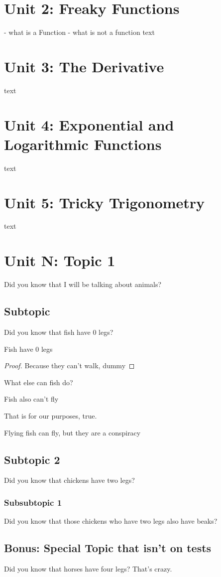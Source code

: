 \documentclass[11pt]{scrartcl}
\begin{document}
\newpage{}
\section{Unit 2: Freaky Functions}
- what is a Function
- what is not a function
text

\newpage{}
\section{Unit 3: The Derivative}

text

\newpage{}
\section{Unit 4: Exponential and Logarithmic Functions}

text

\newpage{}
\section{Unit 5: Tricky Trigonometry}

text

\newpage{}
\section{Unit N: Topic 1}
Did you know that I will be talking about animals?
\subsection{Subtopic}
Did you know that fish have 0 legs?
\begin{theorem}
    Fish have 0 legs
\end{theorem}
\begin{proof}
    Because they can't walk, dummy 
\end{proof}
What else can fish do?
\begin{lemma}
    Fish also can't fly
\end{lemma}
That is for our purposes, true.
\begin{remark}
    Flying fish can fly, but they are a conspiracy
\end{remark}
\subsection{Subtopic 2}
Did you know that chickens have two legs?
\subsubsection{Subsubtopic 1}
Did you know that those chickens who have two legs also have beaks?
\begin{subappendices}
    \subsection{Bonus: Special Topic that isn't on tests}
    Did you know that horses have four legs? That's crazy.
\end{subappendices}
\end{document}
